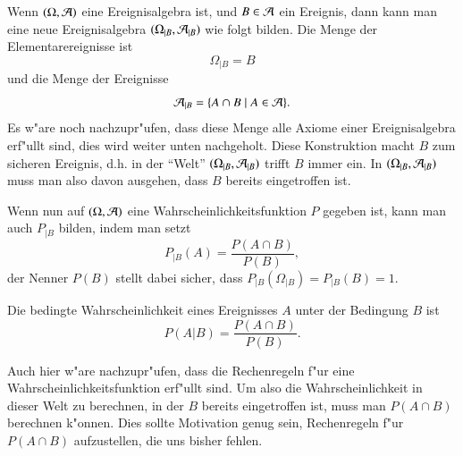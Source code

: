 Wenn
$(\Omega, {\cal A})$ eine Ereignisalgebra ist, und 
$B\in{\cal A}$ ein Ereignis, dann kann man eine neue Ereignisalgebra
$(\Omega_{|B}, {\cal A}_{|B})$ wie folgt bilden. Die Menge der
Elementarereignisse ist
\[
\Omega_{|B}=B
\]
und die Menge der Ereignisse
\[
{\cal A}_{|B}=\{A\cap B\;|\; A\in{\cal A}\}.
\]
Es w"are noch nachzupr"ufen, dass diese Menge alle Axiome einer
Ereignisalgebra erf"ullt sind, dies wird weiter unten nachgeholt.
Diese Konstruktion macht $B$ zum sicheren Ereignis, d.h. in der ``Welt''
$(\Omega_{|B},{\cal A}_{|B})$ trifft $B$ immer ein.
In $(\Omega_{|B},{\cal A}_{|B})$ muss man also davon ausgehen, dass $B$
bereits eingetroffen ist.

Wenn
nun auf $(\Omega, {\cal A})$ eine Wahrscheinlichkeitsfunktion $P$
gegeben ist, kann man auch $P_{|B}$ bilden, indem man setzt
\begin{equation*}
P_{|B}(A)=\frac{P(A\cap B)}{P(B)},
\end{equation*}
der Nenner $P(B)$ stellt dabei sicher, dass $P_{|B}(\Omega_{|B})=P_{|B}(B)=1$.


\begin{definition}
\label{def-bedingte-wahrscheinlichkeit}
Die bedingte Wahrscheinlichkeit eines Ereignisses $A$ unter der Bedingung
$B$ ist
\[
P(A|B)=\frac{P(A\cap B)}{P(B)}.
\]
\end{definition}

Auch hier w"are nachzupr"ufen, dass die Rechenregeln f"ur eine
Wahrscheinlichkeitsfunktion erf"ullt sind.
Um also die Wahrscheinlichkeit in dieser Welt zu berechnen,
in der $B$ bereits eingetroffen ist, 
muss man $P(A\cap B)$ berechnen k"onnen.
Dies sollte Motivation genug sein, Rechenregeln f"ur
$P(A\cap B)$ aufzustellen, die uns bisher fehlen.

